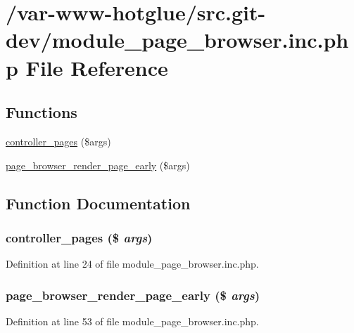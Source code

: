 \hypertarget{module__page__browser_8inc_8php}{
\section{/var-\/www-\/hotglue/src.git-\/dev/module\_\-page\_\-browser.inc.php File Reference}
\label{module__page__browser_8inc_8php}
}
\subsection*{Functions}
\begin{DoxyCompactItemize}
\item 
\hyperlink{module__page__browser_8inc_8php_a7e937f92734b69829f9d3ab5e00f14e0}{controller\_\-pages} (\$args)
\item 
\hyperlink{module__page__browser_8inc_8php_aa94d17bbea100ee50f09c7bf4094a1db}{page\_\-browser\_\-render\_\-page\_\-early} (\$args)
\end{DoxyCompactItemize}


\subsection{Function Documentation}
\hypertarget{module__page__browser_8inc_8php_a7e937f92734b69829f9d3ab5e00f14e0}{
\subsubsection[{controller\_\-pages}]{\setlength{\rightskip}{0pt plus 5cm}controller\_\-pages (\$ {\em args})}}
\label{module__page__browser_8inc_8php_a7e937f92734b69829f9d3ab5e00f14e0}


Definition at line 24 of file module\_\-page\_\-browser.inc.php.

\hypertarget{module__page__browser_8inc_8php_aa94d17bbea100ee50f09c7bf4094a1db}{
\subsubsection[{page\_\-browser\_\-render\_\-page\_\-early}]{\setlength{\rightskip}{0pt plus 5cm}page\_\-browser\_\-render\_\-page\_\-early (\$ {\em args})}}
\label{module__page__browser_8inc_8php_aa94d17bbea100ee50f09c7bf4094a1db}


Definition at line 53 of file module\_\-page\_\-browser.inc.php.

